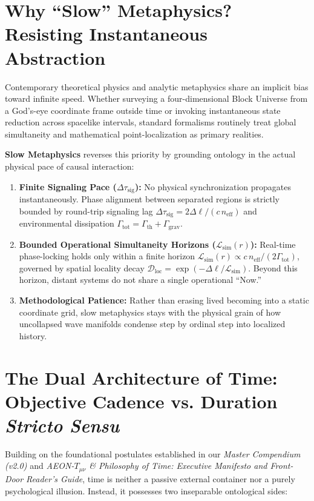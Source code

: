 \documentclass[11pt,a4paper]{article}
\begin{document}
\section{Why ``Slow'' Metaphysics? Resisting Instantaneous Abstraction}

Contemporary theoretical physics and analytic metaphysics share an implicit bias toward infinite speed. Whether surveying a four-dimensional Block Universe from a God's-eye coordinate frame outside time or invoking instantaneous state reduction across spacelike intervals, standard formalisms routinely treat global simultaneity and mathematical point-localization as primary realities.

\textbf{Slow Metaphysics} reverses this priority by grounding ontology in the actual physical pace of causal interaction:
\begin{enumerate}
    \item \textbf{Finite Signaling Pace ($\Delta\tau_{\mathrm{sig}}$):} No physical synchronization propagates instantaneously. Phase alignment between separated regions is strictly bounded by round-trip signaling lag $\Delta\tau_{\mathrm{sig}} = 2\Delta\ell / (c\,n_{\mathrm{eff}})$ and environmental dissipation $\Gamma_{\mathrm{tot}} = \Gamma_{\mathrm{th}} + \Gamma_{\mathrm{grav}}$.
    \item \textbf{Bounded Operational Simultaneity Horizons ($\mathcal{L}_{\mathrm{sim}}(r)$):} Real-time phase-locking holds only within a finite horizon $\mathcal{L}_{\mathrm{sim}}(r) \propto c\,n_{\mathrm{eff}} / (2\Gamma_{\mathrm{tot}})$, governed by spatial locality decay $\mathcal{D}_{\mathrm{loc}} = \exp(-\Delta\ell / \mathcal{L}_{\mathrm{sim}})$. Beyond this horizon, distant systems do not share a single operational ``Now.''
    \item \textbf{Methodological Patience:} Rather than erasing lived becoming into a static coordinate grid, slow metaphysics stays with the physical grain of how uncollapsed wave manifolds condense step by ordinal step into localized history.
\end{enumerate}

\section{The Dual Architecture of Time: Objective Cadence vs. Duration \emph{Stricto Sensu}}

Building on the foundational postulates established in our \emph{Master Compendium (v2.0)} and \emph{AEON-$T_{\mu\nu}$ \& Philosophy of Time: Executive Manifesto and Front-Door Reader's Guide}, time is neither a passive external container nor a purely psychological illusion. Instead, it possesses two inseparable ontological sides:
\end{document}
